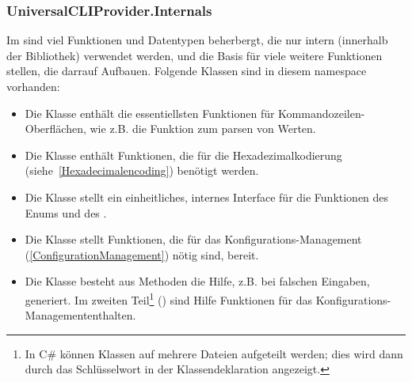  \subsubsection{UniversalCLIProvider.Internals}
 Im  sind viel Funktionen und Datentypen beherbergt, die nur intern (innerhalb der Bibliothek) verwendet werden,
 und die Basis für viele weitere Funktionen stellen, die darrauf Aufbauen.
 Folgende Klassen sind in diesem namespace vorhanden:
 \begin{itemize}
  \item Die  Klasse enthält die essentiellsten Funktionen für Kommandozeilen-Oberflächen, wie z.B. die Funktion zum parsen von Werten.
  \item Die  Klasse enthält Funktionen, die für die Hexadezimalkodierung (siehe~\ref{Hexadecimalencoding}) benötigt werden.
  \item Die  Klasse stellt ein einheitliches, internes Interface für die Funktionen des  Enums und des .
  \item Die  Klasse stellt Funktionen, die für das Konfigurations-Management (\ref{ConfigurationManagement}) nötig sind, bereit.
  \item Die  Klasse besteht aus Methoden die Hilfe, z.B. bei falschen Eingaben, generiert.
  Im zweiten Teil\footnote{In C\# können Klassen auf mehrere Dateien aufgeteilt werden; dies wird dann durch das  Schlüsselwort in der Klassendeklaration angezeigt.} 
  () sind Hilfe Funktionen für das Konfigurations-Managemententhalten.
 \end{itemize}
